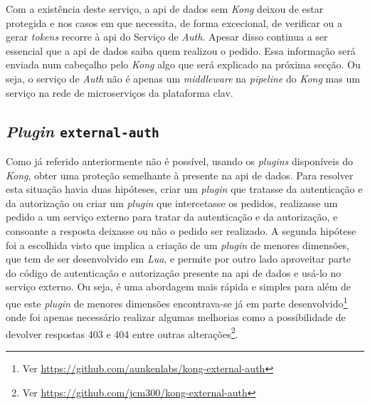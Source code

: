 Com a existência deste serviço, a \acrshort{api} de dados sem \textit{Kong} deixou de estar protegida e nos casos em que necessita, de forma excecional, de verificar ou a gerar  \textit{tokens} recorre à \acrshort{api} do Serviço de \textit{Auth}. Apesar disso continua a ser essencial que a \acrshort{api} de dados saiba quem realizou o pedido. Essa informação será enviada num cabeçalho pelo \textit{Kong} algo que será explicado na próxima secção. Ou seja, o serviço de \textit{Auth} não é apenas um \textit{middleware} na \textit{pipeline} do \textit{Kong} mas um serviço na rede de microserviços da plataforma \acrshort{clav}.

\subsection{\textit{Plugin} \texttt{external-auth}}
Como já referido anteriormente não é possível, usando os \textit{plugins} disponíveis do \textit{Kong}, obter uma proteção semelhante à presente na \acrshort{api} de dados. Para resolver esta situação havia duas hipóteses, criar um \textit{plugin} que tratasse da autenticação e da autorização ou criar um \textit{plugin} que intercetasse os pedidos, realizasse um pedido a um serviço externo para tratar da autenticação e da autorização, e consoante a resposta deixasse ou não o pedido ser realizado. A segunda hipótese foi a escolhida visto que implica a criação de um \textit{plugin} de menores dimensões, que tem de ser desenvolvido em \textit{Lua}, e permite por outro lado aproveitar parte do código de autenticação e autorização presente na \acrshort{api} de dados e usá-lo no serviço externo. Ou seja, é uma abordagem mais rápida e simples para além de que este \textit{plugin} de menores dimensões encontrava-se já em parte desenvolvido\footnote{Ver \url{https://github.com/aunkenlabs/kong-external-auth}} onde foi apenas necessário realizar algumas melhorias como a possibilidade de devolver respostas 403 e 404 entre outras alterações\footnote{Ver \url{https://github.com/jcm300/kong-external-auth}}.

